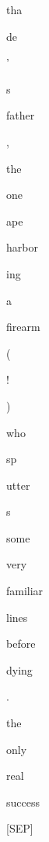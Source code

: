 \documentclass[varwidth=150mm]{standalone}
\begin{document}
\begin{CJK*}{UTF8}{gbsn}
{{{\colorbox{red!12.835346221923828}{\strut tha}\colorbox{red!6.845932960510254}{\strut de} \colorbox{red!0.0}{\strut '} \colorbox{red!0.0}{\strut s} \colorbox{red!0.0}{\strut father} \colorbox{red!1.0859743356704712}{\strut ,} \colorbox{red!3.2935855388641357}{\strut the} \colorbox{red!0.0}{\strut one} \colorbox{red!100.0}{\strut ape} \colorbox{red!0.0}{\strut harbor}\colorbox{red!0.0}{\strut ing} \colorbox{red!0.0}{\strut a} \colorbox{red!3.326634645462036}{\strut firearm} \colorbox{red!1.4427591562271118}{\strut (} \colorbox{red!1.4824954271316528}{\strut !} \colorbox{red!0.0}{\strut )} \colorbox{red!0.0}{\strut who} \colorbox{red!0.0}{\strut sp}\colorbox{red!0.0}{\strut utter}\colorbox{red!0.0}{\strut s} \colorbox{red!1.1966005563735962}{\strut some} \colorbox{red!2.775297164916992}{\strut very} \colorbox{red!0.0}{\strut familiar} \colorbox{red!16.319900512695312}{\strut lines} \colorbox{red!0.0}{\strut before} \colorbox{red!0.0}{\strut dying} \colorbox{red!0.0}{\strut .} \colorbox{red!6.738411903381348}{\strut the} \colorbox{red!2.891873359680176}{\strut only} \colorbox{red!0.0}{\strut real} \colorbox{red!5.662316799163818}{\strut success} \colorbox{red!5.954222202301025}{\strut [SEP]}
}}}
\end{CJK*}
\end{document}
